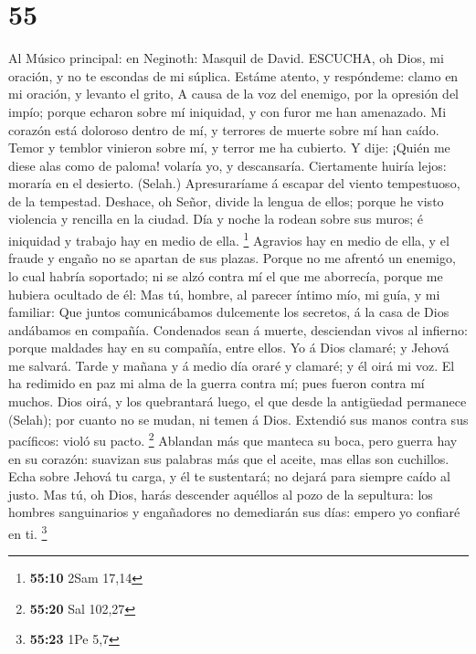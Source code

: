 \hypertarget{section-54}{%
\section{55}\label{section-54}}

 Al Músico principal: en Neginoth: Masquil de David.
ESCUCHA, oh Dios, mi oración, y no te escondas de mi súplica.
 Estáme atento, y respóndeme: clamo en mi oración, y levanto
el grito,  A causa de la voz del enemigo, por la opresión
del impío; porque echaron sobre mí iniquidad, y con furor me han
amenazado.  Mi corazón está doloroso dentro de mí, y
terrores de muerte sobre mí han caído.  Temor y temblor
vinieron sobre mí, y terror me ha cubierto.  Y dije: ¡Quién
me diese alas como de paloma! volaría yo, y descansaría. 
Ciertamente huiría lejos: moraría en el desierto. (Selah.) 
Apresuraríame á escapar del viento tempestuoso, de la tempestad.
 Deshace, oh Señor, divide la lengua de ellos; porque he
visto violencia y rencilla en la ciudad.  Día y noche la
rodean sobre sus muros; é iniquidad y trabajo hay en medio de ella.
\footnote{\textbf{55:10} 2Sam 17,14}  Agravios hay en medio
de ella, y el fraude y engaño no se apartan de sus plazas. 
Porque no me afrentó un enemigo, lo cual habría soportado; ni se alzó
contra mí el que me aborrecía, porque me hubiera ocultado de él:
 Mas tú, hombre, al parecer íntimo mío, mi guía, y mi
familiar:  Que juntos comunicábamos dulcemente los
secretos, á la casa de Dios andábamos en compañía. 
Condenados sean á muerte, desciendan vivos al infierno: porque maldades
hay en su compañía, entre ellos.  Yo á Dios clamaré; y
Jehová me salvará.  Tarde y mañana y á medio día oraré y
clamaré; y él oirá mi voz.  El ha redimido en paz mi alma
de la guerra contra mí; pues fueron contra mí muchos.  Dios
oirá, y los quebrantará luego, el que desde la antigüedad permanece
(Selah); por cuanto no se mudan, ni temen á Dios.  Extendió
sus manos contra sus pacíficos: violó su pacto. \footnote{\textbf{55:20}
  Sal 102,27}  Ablandan más que manteca su boca, pero
guerra hay en su corazón: suavizan sus palabras más que el aceite, mas
ellas son cuchillos.  Echa sobre Jehová tu carga, y él te
sustentará; no dejará para siempre caído al justo.  Mas tú,
oh Dios, harás descender aquéllos al pozo de la sepultura: los hombres
sanguinarios y engañadores no demediarán sus días: empero yo confiaré en
ti. \footnote{\textbf{55:23} 1Pe 5,7}

